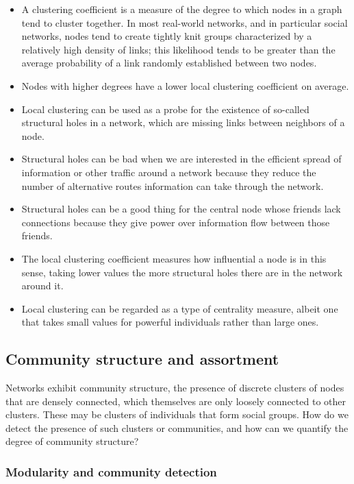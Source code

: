\documentclass[
]{article}
\providecommand{\tightlist}{%
  \setlength{\itemsep}{0pt}\setlength{\parskip}{0pt}}
\begin{document}
\begin{itemize}
\tightlist
\item
  A clustering coefficient is a measure of the degree to which nodes in a graph tend to cluster together. In most real-world networks, and in particular social networks, nodes tend to create tightly knit groups characterized by a relatively high density of links; this likelihood tends to be greater than the average probability of a link randomly established between two nodes.
\item
  Nodes with higher degrees have a lower local clustering coefficient on average.
\item
  Local clustering can be used as a probe for the existence of so-called structural holes in a network, which are missing links between neighbors of a node.
\item
  Structural holes can be bad when we are interested in the efficient spread of information or other traffic around a network because they reduce the number of alternative routes information can take through the network.
\item
  Structural holes can be a good thing for the central node whose friends lack connections because they give power over information flow between those friends.
\item
  The local clustering coefficient measures how influential a node is in this sense, taking lower values the more structural holes there are in the network around it.
\item
  Local clustering can be regarded as a type of centrality measure, albeit one that takes small values for powerful individuals rather than large ones.
\end{itemize}

\hypertarget{community-structure-and-assortment}{%
\subsection{Community structure and assortment}\label{community-structure-and-assortment}}

Networks exhibit community structure, the presence of discrete clusters of nodes that are densely connected, which themselves are only loosely connected to other clusters. These may be clusters of individuals that form social groups. How do we detect the presence of such clusters or communities, and how can we quantify the degree of community structure?

\hypertarget{modularity-and-community-detection}{%
\subsubsection{Modularity and community detection}\label{modularity-and-community-detection}}
\end{document}
